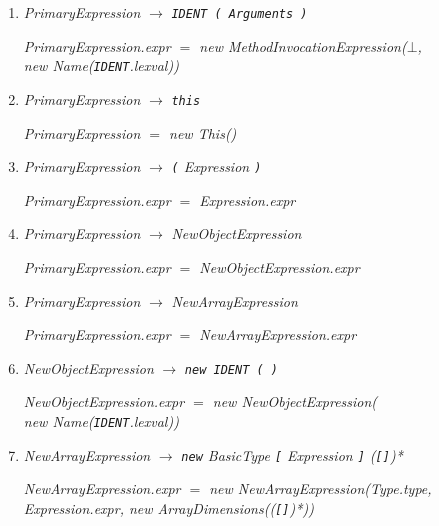 \documentclass[12pt,a4paper]{scrartcl}
\renewcommand{\prod}[2]{\textit{#1} $\rightarrow$ \textit{#2}}
\newcommand{\tok}[1]{\textnormal{\texttt{#1}}}
\newcommand{\assign}[2]{\textit{#1} $=$ #2}
\newcommand{\new}[2]{\textnormal{new #1(\textit{#2})}}
\newcommand{\attr}[1]{\parbox{\linewidth}{\raggedleft \textit{#1}}}
\begin{document}
\begin{enumerate}
        \attr{\assign{PrimaryExpression.expr}{\new{Name}{\tok{IDENT}.lexval}}}
    \item \prod{PrimaryExpression}{\tok{IDENT \tok{(} Arguments \tok{)}}}\\
        \attr{\assign{PrimaryExpression.expr}{\new{MethodInvocationExpression}{$\bot$,\\\new{Name}{\tok{IDENT}.lexval}}}}
    \item \prod{PrimaryExpression}{\tok{this}}\\
        \attr{\assign{PrimaryExpression}{\new{This}{}}}
    \item \prod{PrimaryExpression}{\tok{(} Expression \tok{)}}\\
        \attr{\assign{PrimaryExpression.expr}{Expression.expr}}
    \item \prod{PrimaryExpression}{NewObjectExpression}\\
        \attr{\assign{PrimaryExpression.expr}{NewObjectExpression.expr}}
    \item \prod{PrimaryExpression}{NewArrayExpression}\\
        \attr{\assign{PrimaryExpression.expr}{NewArrayExpression.expr}}
    \item \prod{NewObjectExpression}{\tok{new IDENT ( )}}\\
        \attr{\assign{NewObjectExpression.expr}{\new{NewObjectExpression}{\\\new{Name}{\tok{IDENT}.lexval}}}}
    \item \prod{NewArrayExpression}{\tok{new} BasicType \tok{[} Expression \tok{]} (\tok{[]})*}\\
        \attr{\assign{NewArrayExpression.expr}{\new{NewArrayExpression}{Type.type, Expression.expr, \new{ArrayDimensions}{(\tok{[]})*}}}}
\end{enumerate}
\end{document}
